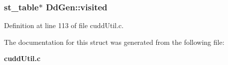 \subsubsection{\setlength{\rightskip}{0pt plus 5cm}\bf{st\_\-table}$\ast$ \bf{Dd\-Gen::visited}}\label{structDdGen_d420d12a7535a20844d3f5676f0abfff}




Definition at line 113 of file cudd\-Util.c.

The documentation for this struct was generated from the following file:\begin{CompactItemize}
\item 
\bf{cudd\-Util.c}\end{CompactItemize}
